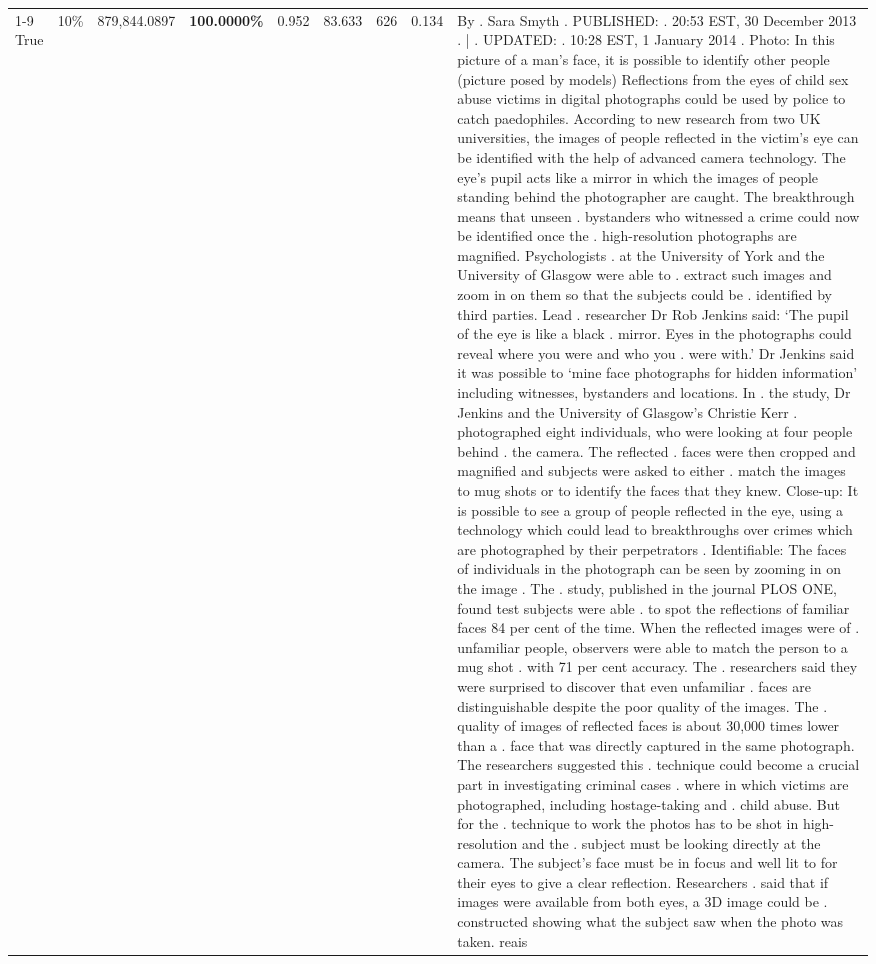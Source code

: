 \begin{table}[H]
\begin{tabular}{lllrlllll}
\cline{1-9} \cline{2-9}
True & 10\% & 879,844.0897 & \bfseries \color{red} 100.0000\% & 0.952 & 83.633 & 626 & 0.134 & By . Sara Smyth . PUBLISHED: . 20:53 EST, 30 December 2013 . | . UPDATED: . 10:28 EST, 1 January 2014 . Photo: In this picture of a man's face, it is possible to identify other people (picture posed by models) Reflections from the eyes of child sex abuse victims in digital photographs could be used by police to catch paedophiles. According to new research from two UK universities, the images of people reflected in the victim's eye can be identified with the help of advanced camera technology. The eye's pupil acts like a mirror in which the images of people standing behind the photographer are caught. The breakthrough means that unseen . bystanders who witnessed a crime could now be identified once the . high-resolution photographs are magnified. Psychologists . at the University of York and the University of Glasgow were able to . extract such images and zoom in on them so that the subjects could be . identified by third parties. Lead . researcher Dr Rob Jenkins said: ‘The pupil of the eye is like a black . mirror. Eyes in the photographs could reveal where you were and who you . were with.' Dr Jenkins said it was possible to ‘mine face photographs for hidden information' including witnesses, bystanders and locations. In . the study, Dr Jenkins and the University of Glasgow's Christie Kerr . photographed eight individuals, who were looking at four people behind . the camera. The reflected . faces were then cropped and magnified and subjects were asked to either . match the images to mug shots or to identify the faces that they knew. Close-up: It is possible to see a group of people reflected in the eye, using a technology which could lead to breakthroughs over crimes which are photographed by their perpetrators . Identifiable: The faces of individuals in the photograph can be seen by zooming in on the image . The . study, published in the journal PLOS ONE, found test subjects were able . to spot the reflections of familiar faces 84 per cent of the time. When the reflected images were of . unfamiliar people, observers were able to match the person to a mug shot . with 71 per cent accuracy. The . researchers said they were surprised to discover that even unfamiliar . faces are distinguishable despite the poor quality of the images. The . quality of images of reflected faces is about 30,000 times lower than a . face that was directly captured in the same photograph. The researchers suggested this . technique could become a crucial part in investigating criminal cases . where in which victims are photographed, including hostage-taking and . child abuse. But for the . technique to work the photos has to be shot in high-resolution and the . subject must be looking directly at the camera. The subject's face must be in focus and well lit to for their eyes to give a clear reflection. Researchers . said that if images were available from both eyes, a 3D image could be . constructed showing what the subject saw when the photo was taken. reais \\

\end{tabular}
\end{table}
